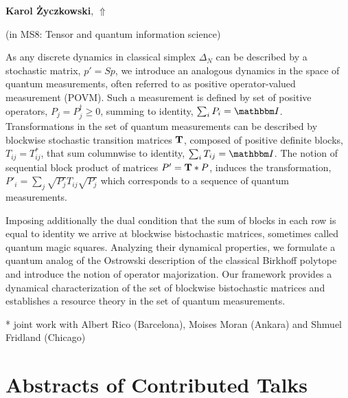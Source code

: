\documentclass[ILAS2025-program.tex]{subfiles}
\begin{document}
\hypertarget{down0053}{}\begin{ilasabstract}
    
\textbf{Karol Życzkowski},  \hfill \hyperlink{up0053}{$\Uparrow$}
    
    
(in {\color{mstitle}MS8: Tensor and quantum information science})
        
\mtskip
    As any discrete dynamics in classical simplex  $\Delta_N$
can be described by a stochastic matrix,  $p'=Sp$,
we introduce an analogous dynamics in the space of 
quantum measurements, often referred to as positive operator-valued measurement (POVM).
Such a measurement is defined by set of positive operators, $P_j = P_j^{\dagger}\ge 0$,
summing to identity, $\sum_i P_i={\mathbbm I}$. Transformations in the set of quantum measurements can be described by blockwise stochastic transition matrices 
$\bf T$, composed of positive definite blocks, $T_{ij}=T_{ij}^*$, that sum columnwise to
identity, $\sum_i T_{ij}= {\mathbbm I}$. 
The notion of sequential block product of matrices 
$P'={\bf T} * P$, 
induces the transformation,
$P'_i = \sum_j \sqrt{P_j} T_{ij}  \sqrt{P_j}$
which corresponds to a sequence of quantum measurements. 

Imposing additionally the dual condition that the sum of blocks in each row is equal
to identity we arrive at blockwise bistochastic matrices, sometimes called 
quantum magic squares. Analyzing their dynamical properties, we formulate a quantum
analog of the Ostrowski description of the classical Birkhoff polytope and introduce
the notion of operator  majorization. Our framework
provides a dynamical characterization of the set of blockwise bistochastic
matrices and establishes a resource theory in the set of quantum measurements.

* joint work with Albert Rico (Barcelona), Moises Moran (Ankara) and Shmuel Fridland (Chicago) 
\end{ilasabstract}
    \newpage

\section{Abstracts of Contributed Talks}
\end{document}
